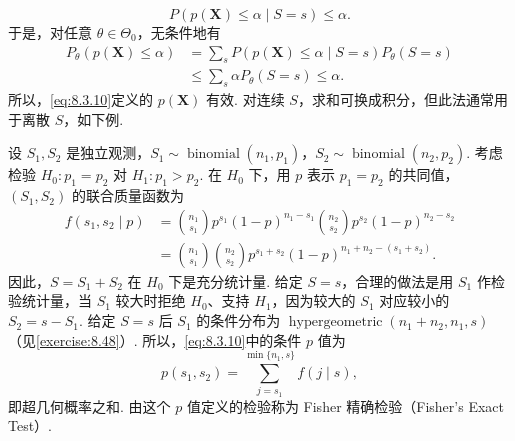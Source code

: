 $$P(p(\boldsymbol X)\le\alpha\mid S=s)\le\alpha.$$
于是，对任意 $\theta\in\Theta_0$，无条件地有
$$\begin{aligned}
P_\theta(p(\boldsymbol X)\le\alpha)&=\sum_sP(p(\boldsymbol X)\le\alpha\mid S=s)P_\theta(S=s)\\
&\le\sum_s\alpha P_\theta(S=s)\le\alpha.
\end{aligned}$$
所以，\eqref{eq:8.3.10}定义的 $p(\boldsymbol X)$ 有效. 对连续 $S$，求和可换成积分，但此法通常用于离散 $S$，如下例.
\begin{example}\label{ex:8.3.30}
设 $S_1,S_2$ 是独立观测，$S_1\sim\operatorname{binomial}(n_1,p_1)$，$S_2\sim\operatorname{binomial}(n_2,p_2)$. 考虑检验 $H_0:p_1=p_2$ 对 $H_1:p_1>p_2$. 在 $H_0$ 下，用 $p$ 表示 $p_1=p_2$ 的共同值，$(S_1,S_2)$ 的联合质量函数为
$$\begin{aligned}
f(s_1,s_2\mid p)&=\binom{n_1}{s_1}p^{s_1}(1-p)^{n_1-s_1}\binom{n_2}{s_2}p^{s_2}(1-p)^{n_2-s_2}\\
&=\binom{n_1}{s_1}\binom{n_2}{s_2}p^{s_1+s_2}(1-p)^{n_1+n_2-(s_1+s_2)}.
\end{aligned}$$
因此，$S=S_1+S_2$ 在 $H_0$ 下是充分统计量. 给定 $S=s$，合理的做法是用 $S_1$ 作检验统计量，当 $S_1$ 较大时拒绝 $H_0$、支持 $H_1$，因为较大的 $S_1$ 对应较小的 $S_2=s-S_1$. 给定 $S=s$ 后 $S_1$ 的条件分布为 $\operatorname{hypergeometric}(n_1+n_2,n_1,s)$（见\autoref{exercise:8.48}\mbox{）.} 所以，\eqref{eq:8.3.10}中的条件 $p$ 值为
$$p(s_1,s_2)=\sum_{j=s_1}^{\min\{n_1,s\}}f(j\mid s),$$
即超几何概率之和. 由这个 $p$ 值定义的检验称为 Fisher 精确检验（Fisher's Exact Test\mbox{）.}
\end{example}
